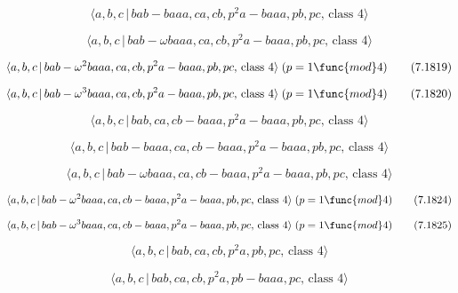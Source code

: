 \documentclass[10pt]{article}
\begin{document}
\begin{equation}
\langle a,b,c\,|\,bab-baaa,ca,cb,p^2a-baaa,pb,pc,\,\text{class }4\rangle 
\tag{7.1817}
\end{equation}

\begin{equation}
\langle a,b,c\,|\,bab-\omega baaa,ca,cb,p^{2}a-baaa,pb,pc,\,\text{class }%
4\rangle  \tag{7.1818}
\end{equation}

\begin{equation}
\langle a,b,c\,|\,bab-\omega ^{2}baaa,ca,cb,p^{2}a-baaa,pb,pc,\,\text{class }%
4\rangle \;(p=1\func{mod}4)  \tag{7.1819}
\end{equation}

\begin{equation}
\langle a,b,c\,|\,bab-\omega ^{3}baaa,ca,cb,p^{2}a-baaa,pb,pc,\,\text{class }%
4\rangle \;(p=1\func{mod}4)  \tag{7.1820}
\end{equation}

\begin{equation}
\langle a,b,c\,|\,bab,ca,cb-baaa,p^2a-baaa,pb,pc,\,\text{class }4\rangle 
\tag{7.1821}
\end{equation}

\begin{equation}
\langle a,b,c\,|\,bab-baaa,ca,cb-baaa,p^2a-baaa,pb,pc,\,\text{class }4\rangle
\tag{7.1822}
\end{equation}

\begin{equation}
\langle a,b,c\,|\,bab-\omega baaa,ca,cb-baaa,p^{2}a-baaa,pb,pc,\,\text{class 
}4\rangle  \tag{7.1823}
\end{equation}

\begin{equation}
\langle a,b,c\,|\,bab-\omega ^{2}baaa,ca,cb-baaa,p^{2}a-baaa,pb,pc,\,\text{%
class }4\rangle \;(p=1\func{mod}4)  \tag{7.1824}
\end{equation}

\begin{equation}
\langle a,b,c\,|\,bab-\omega ^{3}baaa,ca,cb-baaa,p^{2}a-baaa,pb,pc,\,\text{%
class }4\rangle \;(p=1\func{mod}4)  \tag{7.1825}
\end{equation}

\begin{equation}
\langle a,b,c\,|\,bab,ca,cb,p^2a,pb,pc,\,\text{class }4\rangle  \tag{7.1826}
\end{equation}

\begin{equation}
\langle a,b,c\,|\,bab,ca,cb,p^2a,pb-baaa,pc,\,\text{class }4\rangle 
\tag{7.1827}
\end{equation}
\end{document}
